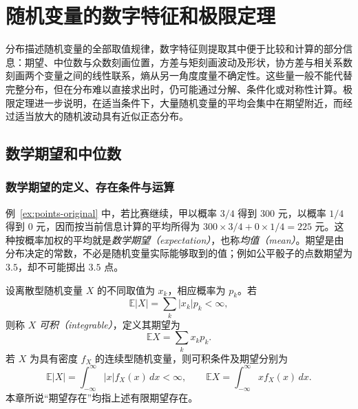 \setcounter{chapter}{3} %
\chapter{随机变量的数字特征和极限定理}
\label{chap:study-moments-limits}


分布描述随机变量的全部取值规律，数字特征则提取其中便于比较和计算的部分信息：期望、中位数与众数刻画位置，方差与矩刻画波动及形状，协方差与相关系数刻画两个变量之间的线性联系，熵从另一角度度量不确定性。这些量一般不能代替完整分布，但在分布难以直接求出时，仍可能通过分解、条件化或对称性计算。极限定理进一步说明，在适当条件下，大量随机变量的平均会集中在期望附近，而经过适当放大的随机波动具有近似正态分布。

\section{数学期望和中位数}
\label{sec:study-expectation-median}

\subsection{数学期望的定义、存在条件与运算}
\label{subsec:study-expectation-properties}

例~\ref{ex:points-original} 中，若比赛继续，甲以概率 $3/4$ 得到 $300$ 元，以概率 $1/4$ 得到 $0$ 元，因而按当前信息计算的平均所得为 $300\times3/4+0\times1/4=225$ 元。这种按概率加权的平均就是\emph{数学期望（expectation）}，也称\emph{均值（mean）}。期望是由分布决定的常数，不必是随机变量实际能够取到的值；例如公平骰子的点数期望为 $3.5$，却不可能掷出 $3.5$ 点。

\begin{definition}
\label{def:study-expectation}
设离散型随机变量 $X$ 的不同取值为 $x_k$，相应概率为 $p_k$。若
\[
  \mathbb E|X|=\sum_k|x_k|p_k<\infty,
\]
则称 $X$ \emph{可积（integrable）}，定义其期望为
\begin{equation}
  \mathbb E X=\sum_k x_kp_k.
  \label{eq:study-discrete-expectation}
\end{equation}
若 $X$ 为具有密度 $f_X$ 的连续型随机变量，则可积条件及期望分别为
\begin{equation}
  \mathbb E|X|=\int_{-\infty}^{\infty}|x|f_X(x)\,dx<\infty,
  \qquad
  \mathbb E X=\int_{-\infty}^{\infty}xf_X(x)\,dx.
  \label{eq:study-continuous-expectation}
\end{equation}
本章所说“期望存在”均指上述有限期望存在。
\end{definition}

